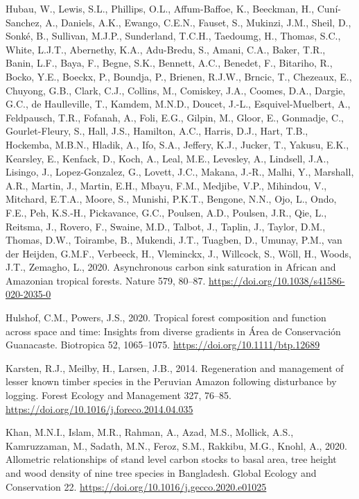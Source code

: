 \documentclass[
  12pt,
]{article}
\newlength{\cslhangindent}
\newlength{\cslentryspacingunit} %
\newenvironment{CSLReferences}[2] %
 {%
  \setlength{\parindent}{0pt}
  \ifodd #1
  \let\oldpar\par
  \def\par{\hangindent=\cslhangindent\oldpar}
  \fi
  \setlength{\parskip}{#2\cslentryspacingunit}
 }%
 {}
\begin{document}
\begin{CSLReferences}{1}{0}
\leavevmode{}%
Hubau, W., Lewis, S.L., Phillips, O.L., Affum-Baffoe, K., Beeckman, H., Cuní-Sanchez, A., Daniels, A.K., Ewango, C.E.N., Fauset, S., Mukinzi, J.M., Sheil, D., Sonké, B., Sullivan, M.J.P., Sunderland, T.C.H., Taedoumg, H., Thomas, S.C., White, L.J.T., Abernethy, K.A., Adu-Bredu, S., Amani, C.A., Baker, T.R., Banin, L.F., Baya, F., Begne, S.K., Bennett, A.C., Benedet, F., Bitariho, R., Bocko, Y.E., Boeckx, P., Boundja, P., Brienen, R.J.W., Brncic, T., Chezeaux, E., Chuyong, G.B., Clark, C.J., Collins, M., Comiskey, J.A., Coomes, D.A., Dargie, G.C., de Haulleville, T., Kamdem, M.N.D., Doucet, J.-L., Esquivel-Muelbert, A., Feldpausch, T.R., Fofanah, A., Foli, E.G., Gilpin, M., Gloor, E., Gonmadje, C., Gourlet-Fleury, S., Hall, J.S., Hamilton, A.C., Harris, D.J., Hart, T.B., Hockemba, M.B.N., Hladik, A., Ifo, S.A., Jeffery, K.J., Jucker, T., Yakusu, E.K., Kearsley, E., Kenfack, D., Koch, A., Leal, M.E., Levesley, A., Lindsell, J.A., Lisingo, J., Lopez-Gonzalez, G., Lovett, J.C., Makana, J.-R., Malhi, Y., Marshall, A.R., Martin, J., Martin, E.H., Mbayu, F.M., Medjibe, V.P., Mihindou, V., Mitchard, E.T.A., Moore, S., Munishi, P.K.T., Bengone, N.N., Ojo, L., Ondo, F.E., Peh, K.S.-H., Pickavance, G.C., Poulsen, A.D., Poulsen, J.R., Qie, L., Reitsma, J., Rovero, F., Swaine, M.D., Talbot, J., Taplin, J., Taylor, D.M., Thomas, D.W., Toirambe, B., Mukendi, J.T., Tuagben, D., Umunay, P.M., van der Heijden, G.M.F., Verbeeck, H., Vleminckx, J., Willcock, S., Wöll, H., Woods, J.T., Zemagho, L., 2020. Asynchronous carbon sink saturation in {African} and {Amazonian} tropical forests. Nature 579, 80--87. \url{https://doi.org/10.1038/s41586-020-2035-0}

\leavevmode{}%
Hulshof, C.M., Powers, J.S., 2020. Tropical forest composition and function across space and time: {Insights} from diverse gradients in {Área} de {Conservación Guanacaste}. Biotropica 52, 1065--1075. \url{https://doi.org/10.1111/btp.12689}

\leavevmode{}%
Karsten, R.J., Meilby, H., Larsen, J.B., 2014. Regeneration and management of lesser known timber species in the {Peruvian Amazon} following disturbance by logging. Forest Ecology and Management 327, 76--85. \url{https://doi.org/10.1016/j.foreco.2014.04.035}

\leavevmode{}%
Khan, M.N.I., Islam, M.R., Rahman, A., Azad, M.S., Mollick, A.S., Kamruzzaman, M., Sadath, M.N., Feroz, S.M., Rakkibu, M.G., Knohl, A., 2020. Allometric relationships of stand level carbon stocks to basal area, tree height and wood density of nine tree species in {Bangladesh}. Global Ecology and Conservation 22. \url{https://doi.org/10.1016/j.gecco.2020.e01025}


\end{CSLReferences}
\end{document}
